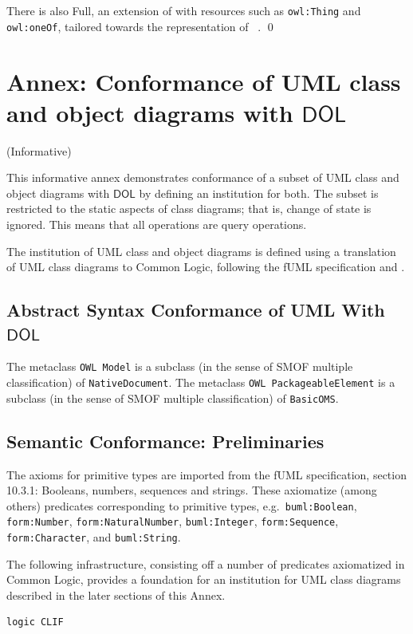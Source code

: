 \documentclass[10pt,fleqn,final]{scrreprt}
\newcommand*{\syntax}[1]{\texttt{#1}}
\newcommand*{\DOL}{\ensuremath{\mathsf{DOL}}\xspace}
\newcommand{\informative}[0]{{\begin{center}{\Large{(Informative})}\end{center}} \bigskip}
\newcommand{\infannex}[1]{ \chapter{Annex: #1}  \informative }
\newenvironment{definitions}[0]{\medskip }{}
\begin{document}
\begin{definitions}
\begin{definition}
There is also \OWL Full, an extension of \RDFS with resources
such as \texttt{owl:Thing} and \texttt{owl:oneOf}, tailored towards the representation of
\OWL~\cite{W3C:REC-owl2-rdf-based-semantics-20091027}.
\qed\end{definition}


\infannex{Conformance of UML class and object diagrams with \DOL}\label{a:uml-class}

This informative annex demonstrates conformance of a subset of UML class and
object diagrams with \DOL by defining an institution for both.  The subset is restricted to the
 static aspects of class diagrams; that is, change
of state is ignored. This means that all operations are query
operations.

The institution of UML class and object diagrams is defined using a
translation of UML class diagrams to Common Logic, following the fUML
specification and \cite{Seidewitz08}.

\section{Abstract Syntax Conformance of UML With \DOL}

The metaclass \syntax{OWL Model} is a subclass (in the sense of SMOF
multiple classification) of \syntax{NativeDocument}.
The metaclass \syntax{OWL PackageableElement} is a subclass (in the sense of SMOF
multiple classification) of \syntax{BasicOMS}.

\section{Semantic Conformance: Preliminaries}

 The axioms for primitive types
are imported from the fUML specification, section 10.3.1:
Booleans, numbers, sequences and strings.  These
axiomatize (among others) predicates corresponding to primitive types,
e.g.\ \texttt{buml:Boolean}, \texttt{form:Number},
\texttt{form:NaturalNumber}, \texttt{buml:Integer},
\texttt{form:Sequence}, \texttt{form:Character}, and
\texttt{buml:String}.


The following infrastructure, consisting off a number of predicates axiomatized in Common Logic,
provides a foundation for an institution for UML class diagrams described in the later sections of
this Annex. 


\begin{lstlisting}[language=clif,morekeywords={then,with,logic,oms,end},mathescape]
logic CLIF


\end{lstlisting}
\end{definitions}
\end{document}
